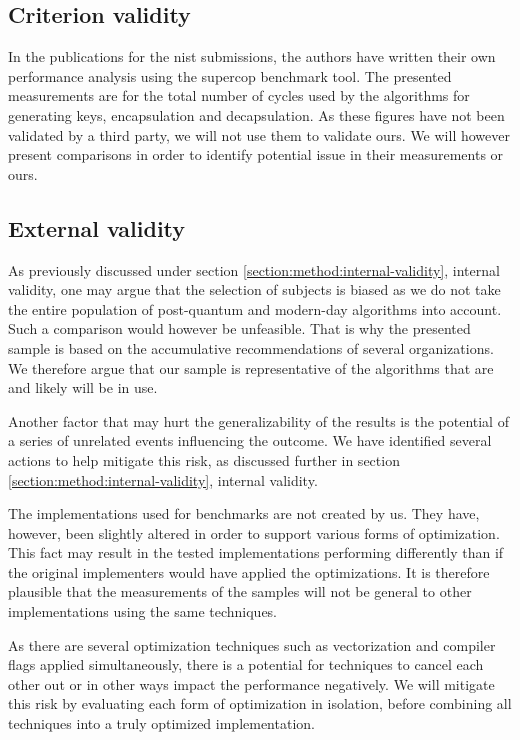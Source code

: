 
\subsection{Criterion validity}
In the publications for the \gls{nist} submissions, the authors have written their own performance analysis using the \gls{supercop} benchmark tool. The presented measurements are for the total number of cycles used by the algorithms for generating keys, encapsulation and decapsulation. As these figures have not been validated by a third party, we will not use them to validate ours. We will however present comparisons in order to identify potential issue in their measurements or ours.

\subsection{External validity}

As previously discussed under section \ref{section:method:internal-validity}, internal validity, one may argue that the selection of subjects is biased as we do not take the entire population of post-quantum and modern-day algorithms into account. Such a comparison would however be unfeasible. That is why the presented sample is based on the accumulative recommendations of several organizations. We therefore argue that our sample is representative of the algorithms that are and likely will be in use.

Another factor that may hurt the generalizability of the results is the potential of a series of unrelated events influencing the outcome. We have identified several actions to help mitigate this risk, as discussed further in section \ref{section:method:internal-validity}, internal validity.

The implementations used for benchmarks are not created by us. They have, however, been slightly altered in order to support various forms of optimization. This fact may result in the tested implementations performing differently than if the original implementers would have applied the optimizations. It is therefore plausible that the measurements of the samples will not be general to other implementations using the same techniques.

As there are several optimization techniques such as vectorization and compiler flags applied simultaneously, there is a potential for techniques to cancel each other out or in other ways impact the performance negatively. We will mitigate this risk by evaluating each form of optimization in isolation, before combining all techniques into a truly optimized implementation.

